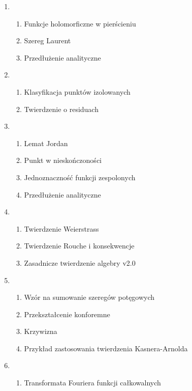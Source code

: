 \documentclass[main.tex]{subfiles}
\begin{document}
\begin{enumerate}
\begin{enumerate}
            \end{enumerate}
        \item
            \begin{enumerate}
                \item Funkcje holomorficzne w pierścieniu
                \item Szereg Laurent
                \item Przedłużenie analityczne
            \end{enumerate}
        \item
            \begin{enumerate}
                \item Klasyfikacja punktów izolowanych
                \item Twierdzenie o residuach
            \end{enumerate}
        \item
            \begin{enumerate}
                \item Lemat Jordan
                \item Punkt w nieskończoności
                \item Jednoznaczność funkcji zespolonych
                \item Przedłużenie analityczne
            \end{enumerate}
        \item
            \begin{enumerate}
                \item Twierdzenie Weierstrass
                \item Twierdzenie Rouche i konsekwencje
                \item Zasadnicze twierdzenie algebry v2.0
            \end{enumerate}
        \item
            \begin{enumerate}
                \item Wzór na sumowanie szeregów potęgowych
                \item Przekształcenie konforemne
                \item Krzywizna
                \item Przykład zastosowania twierdzenia Kasnera-Arnolda
            \end{enumerate}
        \item
            \begin{enumerate}
                \item Transformata Fouriera funkcji całkowalnych

\end{enumerate}
\end{enumerate}
\end{document}
